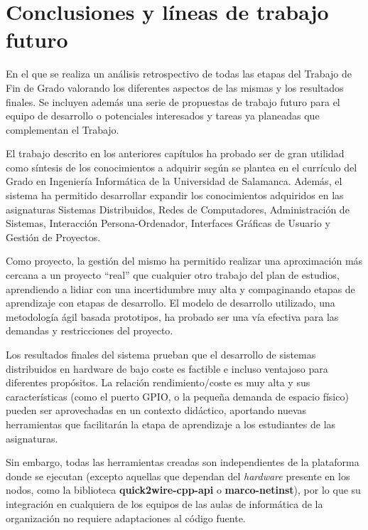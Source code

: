 \chapter{Conclusiones y líneas de trabajo futuro}

\begin{cabstract}

En el que se realiza un análisis retrospectivo de todas las etapas del Trabajo de Fin de Grado valorando los diferentes aspectos de las mismas y los resultados finales. Se incluyen además una serie de propuestas de trabajo futuro para el equipo de desarrollo o potenciales interesados y tareas ya planeadas que complementan el Trabajo.

\end{cabstract}

El trabajo descrito en los anteriores capítulos ha probado ser de gran utilidad como síntesis de los conocimientos a adquirir según se plantea en el currículo del Grado en Ingeniería Informática de la Universidad de Salamanca. Además, el sistema ha permitido desarrollar expandir los conocimientos adquiridos en las asignaturas Sistemas Distribuidos, Redes de Computadores, Administración de Sistemas, Interacción Persona-Ordenador, Interfaces Gráficas de Usuario y Gestión de Proyectos.

Como proyecto, la gestión del mismo ha permitido realizar una aproximación más cercana a un proyecto ``real'' que cualquier otro trabajo del plan de estudios, aprendiendo a lidiar con una incertidumbre muy alta y compaginando etapas de aprendizaje con etapas de desarrollo. El modelo de desarrollo utilizado, una metodología ágil basada prototipos, ha probado ser una vía efectiva para las demandas y restricciones del proyecto.

Los resultados finales del sistema prueban que el desarrollo de sistemas distribuidos en hardware de bajo coste es factible e incluso ventajoso para diferentes propósitos. La relación rendimiento/coste es muy alta y sus características (como el puerto GPIO, o la pequeña demanda de espacio físico) pueden ser aprovechadas en un contexto didáctico, aportando nuevas herramientas que facilitarán la etapa de aprendizaje a los estudiantes de las asignaturas.

Sin embargo, todas las herramientas creadas son independientes de la plataforma donde se ejecutan (excepto aquellas que dependan del \textit{hardware} presente en los nodos, como la biblioteca \textbf{quick2wire-cpp-api} o \textbf{marco-netinst}), por lo que su integración en cualquiera de los equipos de las aulas de informática de la organización no requiere adaptaciones al código fuente.


